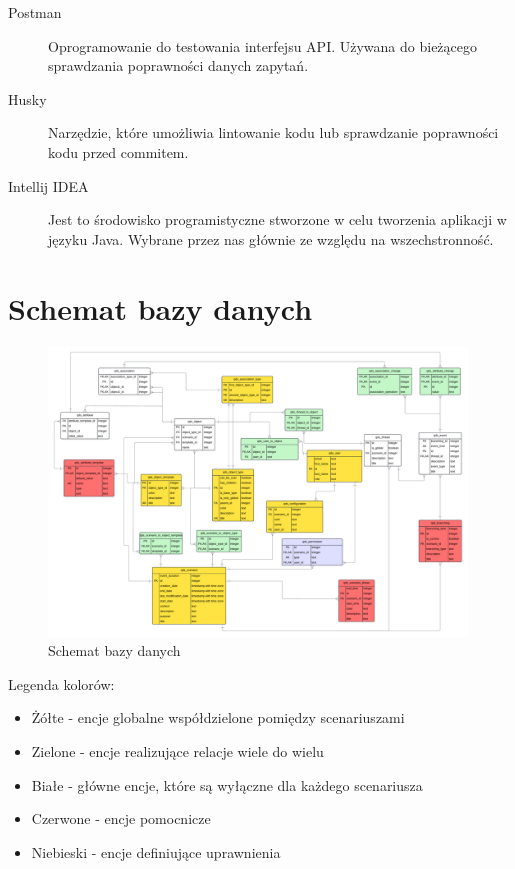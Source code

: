 \begin{description}
    \item[Postman] Oprogramowanie do testowania interfejsu API. Używana do bieżącego sprawdzania poprawności danych zapytań.
    \item[Husky] Narzędzie, które umożliwia lintowanie kodu lub sprawdzanie poprawności kodu przed commitem.
    \item[Intellij IDEA] Jest to środowisko programistyczne stworzone w celu tworzenia aplikacji w języku Java. Wybrane przez nas głównie ze względu na wszechstronność.
\end{description}


\newpage
\section{Schemat bazy danych}

\begin{figure}[h!]
    \centering
    \includegraphics[width=0.99\textwidth]{resources/local/baza-danych-schemat.png}
    \caption{Schemat bazy danych}
\end{figure}

Legenda kolorów:
\begin{itemize}
    \item Żółte - encje globalne współdzielone pomiędzy scenariuszami
    \item Zielone - encje realizujące relacje wiele do wielu
    \item Białe - główne encje, które są wyłączne dla każdego scenariusza
    \item Czerwone - encje pomocnicze
    \item Niebieski - encje definiujące uprawnienia
\end{itemize}

